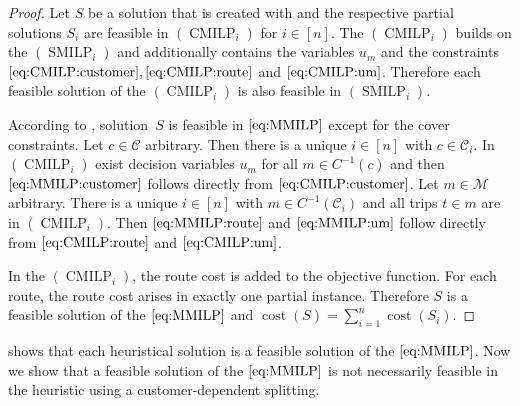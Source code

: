 \begin{proof}

Let $S$ be a solution that is created with  and the respective partial solutions $S_i$ are feasible in $(\operatorname{CMILP}_i)$ for ${i\in[n]}$. The $(\operatorname{CMILP}_i)$ builds on the $(\operatorname{SMILP}_i)$ and additionally contains the variables $u_m$ and the constraints $\eqref{eq:CMILP:customer}, \eqref{eq:CMILP:route}$ and $\eqref{eq:CMILP:um}$. Therefore each feasible solution of the $(\operatorname{CMILP}_i)$ is also feasible in $(\operatorname{SMILP}_i)$.

According to , solution~$S$ is feasible in $\eqref{eq:MMILP}$ except for the cover constraints. Let $c\in\mathcal{C}$ arbitrary. Then there is a unique $i\in[n]$ with ${c\in\mathcal{C}_i}$. In $(\operatorname{CMILP}_i)$ exist decision variables $u_m$ for all ${m\in C^{-1}(c)}$ and then $\eqref{eq:MMILP:customer}$ follows directly from $\eqref{eq:CMILP:customer}$. Let ${m\in\mathcal{M}}$ arbitrary. There is a unique ${i\in[n]}$ with ${m\in C^{-1}(\mathcal{C}_i)}$ and all trips ${t\in m}$ are in $(\operatorname{CMILP}_i)$. Then $\eqref{eq:MMILP:route}$ and $\eqref{eq:MMILP:um}$ follow directly from $\eqref{eq:CMILP:route}$ and $\eqref{eq:CMILP:um}$. 

In the $(\operatorname{CMILP}_i)$, the route cost is added to the objective function. For each route, the route cost arises in exactly one partial instance. Therefore $S$ is a feasible solution of the $\eqref{eq:MMILP}$ and ${\operatorname{cost}(S) = \sum_{i=1}^n\operatorname{cost}\left(S_i\right)}$.
%
\end{proof}

 shows that each heuristical solution is a feasible solution of the $\eqref{eq:MMILP}$. Now we show that a feasible solution of the $\eqref{eq:MMILP}$ is not necessarily feasible in the heuristic using a customer-dependent splitting.

